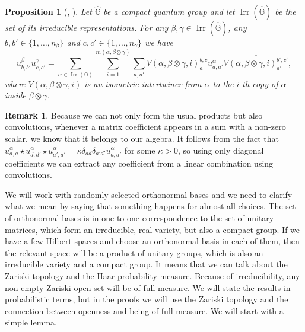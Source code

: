 \documentclass[12pt]{amsart}
\newcommand{\op}[1]{\operatorname{#1}}
\newtheorem{prop}[thm]{Proposition}
\theoremstyle{definition}
\theoremstyle{definition}
\theoremstyle{definition}
\theoremstyle{definition}
\newtheorem{remark}[thm]{Remark}
\newcommand{\G}{\mathbb{G}}
\numberwithin{equation}{section}
\begin{document}
\begin{prop}[{\cite{KS18}, \cite[Lemma 4.1]{KS17}}]\label{prop:coeffmultiplication}
Let $\widehat{\G}$ be a compact quantum group and let $\op{Irr}(\widehat{\G})$ be the set of its irreducible representations. For any $\beta,\gamma \in \op{Irr}(\widehat{\G})$, any $b,b' \in \{1,\dots, n_{\beta}\}$ and $c,c'\in \{1,\dots, n_{\gamma}\}$ we have
\begin{equation}\label{Eq:coeffmultiplication}
u_{b,b'}^{\beta} u_{c,c'}^{\gamma} = \sum_{\alpha \in \op{Irr}(\G)} \sum_{i=1}^{m(\alpha, \beta\otimes \gamma)} \sum_{a,a'} V(\alpha, \beta\otimes \gamma, i)_{a}^{b,c} u_{a,a'}^{\alpha} \overline{V(\alpha,\beta\otimes \gamma,i)_{a'}^{b',c'}},
\end{equation}
where $V(\alpha,\beta\otimes\gamma, i)$ is an isometric intertwiner from $\alpha$ to the $i$-th copy of $\alpha$ inside $\beta\otimes \gamma$.
\end{prop}
\begin{remark}\label{rem:cuttingcoeff}
Because we can not only form the usual products but also convolutions, whenever a matrix coefficient appears in a sum with a non-zero scalar, we know that it belongs to our algebra. It follows from the fact that $u_{a,a}^{\alpha} \star u_{d,d'}^{\alpha} \star u_{a',a'}^{\alpha} = \kappa \delta_{ad} \delta_{a'd'} u_{a,a'}^{\alpha}$ for some  $\kappa>0$, so using only diagonal coefficients we can extract any coefficient from a linear combination using convolutions.
\end{remark}
We will work with randomly selected orthonormal bases and we need to clarify what we mean by saying that something happens for almost all choices. The set of orthonormal bases is in one-to-one correspondence to the set of unitary matrices, which form an irreducible, real variety, but also a compact group. If we have a few Hilbert spaces and choose an orthonormal basis in each of them, then the relevant space will be a product of unitary groups, which is also an irreducible variety and a compact group. It means that we can talk about the Zariski topology and the Haar probability measure. Because of irreducibility, any non-empty Zariski open set will be of full measure. We will state the results in probabilistic terms, but in the proofs we will use the Zariski topology and the connection between openness and being of full measure. We will start with a simple lemma.
\end{document}
